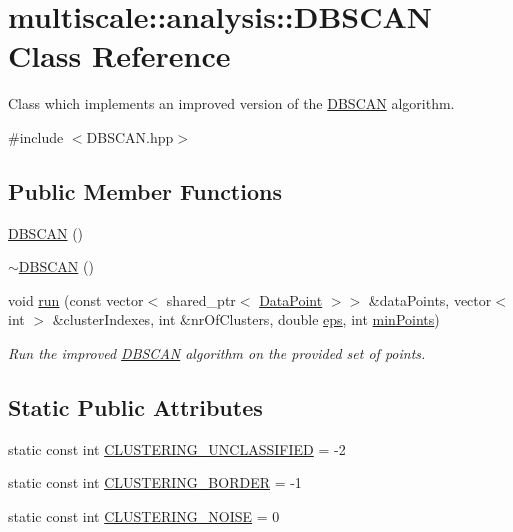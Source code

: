 \hypertarget{classmultiscale_1_1analysis_1_1DBSCAN}{\section{multiscale\-:\-:analysis\-:\-:\-D\-B\-S\-C\-A\-N \-Class \-Reference}
\label{classmultiscale_1_1analysis_1_1DBSCAN}
}


\-Class which implements an improved version of the \hyperlink{classmultiscale_1_1analysis_1_1DBSCAN}{\-D\-B\-S\-C\-A\-N} algorithm.  




{\ttfamily \#include $<$\-D\-B\-S\-C\-A\-N.\-hpp$>$}

\subsection*{\-Public \-Member \-Functions}
\begin{DoxyCompactItemize}
\item 
\hyperlink{classmultiscale_1_1analysis_1_1DBSCAN_abcfe88a7c0a94730a128e4682d8f27ca}{\-D\-B\-S\-C\-A\-N} ()
\item 
\hyperlink{classmultiscale_1_1analysis_1_1DBSCAN_a4deb359da661ba495d18a75f43a0b89c}{$\sim$\-D\-B\-S\-C\-A\-N} ()
\item 
void \hyperlink{classmultiscale_1_1analysis_1_1DBSCAN_a52f0eb2d04029c75a3c48a37efdac26b}{run} (const vector$<$ shared\-\_\-ptr$<$ \hyperlink{classmultiscale_1_1analysis_1_1DataPoint}{\-Data\-Point} $>$$>$ \&data\-Points, vector$<$ int $>$ \&cluster\-Indexes, int \&nr\-Of\-Clusters, double \hyperlink{classmultiscale_1_1analysis_1_1DBSCAN_a8d68cd84561cbb06bd138f8edf340b9f}{eps}, int \hyperlink{classmultiscale_1_1analysis_1_1DBSCAN_a7bafd4070ac44e236fcc7f06d92b6572}{min\-Points})
\begin{DoxyCompactList}\small\item\em \-Run the improved \hyperlink{classmultiscale_1_1analysis_1_1DBSCAN}{\-D\-B\-S\-C\-A\-N} algorithm on the provided set of points. \end{DoxyCompactList}\end{DoxyCompactItemize}
\subsection*{\-Static \-Public \-Attributes}
\begin{DoxyCompactItemize}
\item 
static const int \hyperlink{classmultiscale_1_1analysis_1_1DBSCAN_a6f60961639281a807b63650faf01511b}{\-C\-L\-U\-S\-T\-E\-R\-I\-N\-G\-\_\-\-U\-N\-C\-L\-A\-S\-S\-I\-F\-I\-E\-D} = -\/2
\item 
static const int \hyperlink{classmultiscale_1_1analysis_1_1DBSCAN_a28f37ffc029ccd1d121cbc4467851ce2}{\-C\-L\-U\-S\-T\-E\-R\-I\-N\-G\-\_\-\-B\-O\-R\-D\-E\-R} = -\/1
\item 
static const int \hyperlink{classmultiscale_1_1analysis_1_1DBSCAN_a480b43a01f8652787a4b0f61b00ee3cf}{\-C\-L\-U\-S\-T\-E\-R\-I\-N\-G\-\_\-\-N\-O\-I\-S\-E} = 0
\end{DoxyCompactItemize}
